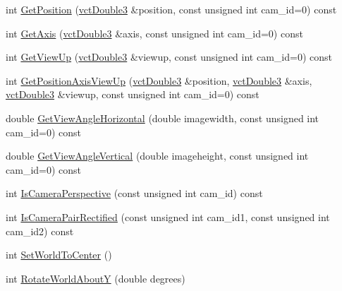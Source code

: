 \begin{DoxyCompactItemize}
\item 
int \hyperlink{classsvl_sample_camera_geometry_afb39bdd80a14a9f4b1b90f88ad29201f}{Get\+Position} (\hyperlink{vct_fixed_size_vector_types_8h_a4a89122c9d7f72c3f31fe8126e17c3af}{vct\+Double3} \&position, const unsigned int cam\+\_\+id=0) const 
\item 
int \hyperlink{classsvl_sample_camera_geometry_a7f2a014a519626ae96ee750fd58b7b1c}{Get\+Axis} (\hyperlink{vct_fixed_size_vector_types_8h_a4a89122c9d7f72c3f31fe8126e17c3af}{vct\+Double3} \&axis, const unsigned int cam\+\_\+id=0) const 
\item 
int \hyperlink{classsvl_sample_camera_geometry_a544b13a54719dbf1a77aa5ce10ba2c91}{Get\+View\+Up} (\hyperlink{vct_fixed_size_vector_types_8h_a4a89122c9d7f72c3f31fe8126e17c3af}{vct\+Double3} \&viewup, const unsigned int cam\+\_\+id=0) const 
\item 
int \hyperlink{classsvl_sample_camera_geometry_af3f63bfae535b243e0cfc62f60d384cb}{Get\+Position\+Axis\+View\+Up} (\hyperlink{vct_fixed_size_vector_types_8h_a4a89122c9d7f72c3f31fe8126e17c3af}{vct\+Double3} \&position, \hyperlink{vct_fixed_size_vector_types_8h_a4a89122c9d7f72c3f31fe8126e17c3af}{vct\+Double3} \&axis, \hyperlink{vct_fixed_size_vector_types_8h_a4a89122c9d7f72c3f31fe8126e17c3af}{vct\+Double3} \&viewup, const unsigned int cam\+\_\+id=0) const 
\item 
double \hyperlink{classsvl_sample_camera_geometry_a4d5a01caf8efe171739dec0b31d69c66}{Get\+View\+Angle\+Horizontal} (double imagewidth, const unsigned int cam\+\_\+id=0) const 
\item 
double \hyperlink{classsvl_sample_camera_geometry_ab2ea225f8e4d652d91c54ba0c2ea824e}{Get\+View\+Angle\+Vertical} (double imageheight, const unsigned int cam\+\_\+id=0) const 
\item 
int \hyperlink{classsvl_sample_camera_geometry_ae785787ab8b1c68cd7516fcdfdc056db}{Is\+Camera\+Perspective} (const unsigned int cam\+\_\+id) const 
\item 
int \hyperlink{classsvl_sample_camera_geometry_a9c067b342b467eb20db1832da98b9a4f}{Is\+Camera\+Pair\+Rectified} (const unsigned int cam\+\_\+id1, const unsigned int cam\+\_\+id2) const 
\item 
int \hyperlink{classsvl_sample_camera_geometry_a7acde8951ac37d5094f0f2d4ad2ffece}{Set\+World\+To\+Center} ()
\item 
int \hyperlink{classsvl_sample_camera_geometry_ad582b4b6aabbc82c01ef9e42b70d8b65}{Rotate\+World\+About\+Y} (double degrees)
\item 

\end{DoxyCompactItemize}
